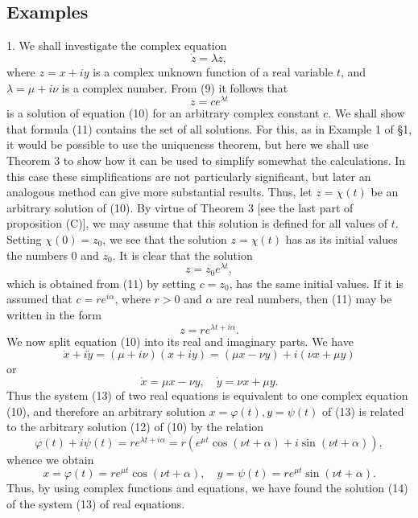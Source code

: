 \documentclass[10pt,a5paper]{book}
\theoremstyle{plain}
\theoremstyle{definition}
\theoremstyle{remark}
\begin{document}
\subsection*{Examples}
1. We shall investigate the complex equation
\begin{equation*}
\dot{z}=\lambda z, \tag{10}
\end{equation*}
where $z=x+i y$ is a complex unknown function of a real variable $t$, and $\lambda=\mu+i \nu$ is a complex number. From (9) it follows that
\begin{equation*}
z=c e^{\lambda t} \tag{11}
\end{equation*}
is a solution of equation (10) for an arbitrary complex constant $c$. We
shall show that formula (11) contains the set of all solutions. For this, as in Example 1 of §1, it would be possible to use the uniqueness theorem, but here we shall use Theorem 3 to show how it can be used to simplify somewhat the calculations. In this case these simplifications are not particularly significant, but later an analogous method can give more substantial results. Thus, let $z=\chi(t)$ be an arbitrary solution of (10). By virtue of Theorem 3 [see the last part of proposition (C)], we may assume that this solution is defined for all values of $t$. Setting $\chi(0)=z_{0}$, we see that the solution $z=\chi(t)$ has as its initial values the numbers 0 and $z_{0}$. It is clear that the solution
\[
z=z_{0} e^{\lambda t},
\]
which is obtained from (11) by setting $c=z_{0}$, has the same initial values. If it is assumed that $c=r e^{i \alpha}$, where $r>0$ and $\alpha$ are real numbers, then (11) may be written in the form
\begin{equation*}
z=r e^{\lambda t+i \alpha} . \tag{12}
\end{equation*}
We now split equation (10) into its real and imaginary parts. We have
\[
\dot{x}+i \dot{y}=(\mu+i \nu)(x+i y)=(\mu x-\nu y)+i(\nu x+\mu y)
\]
or
\begin{equation*}
\dot{x}=\mu x-\nu y, \quad \dot{y}=\nu x+\mu y . \tag{13}
\end{equation*}
Thus the system (13) of two real equations is equivalent to one complex equation (10), and therefore an arbitrary solution $x=\varphi(t), y=\psi(t)$ of (13) is related to the arbitrary solution (12) of (10) by the relation
\[
\varphi(t)+i \psi(t)=r e^{\lambda t+i \alpha}=r\left(e^{\mu t} \cos (\nu t+\alpha)+i \sin (\nu t+\alpha)\right),
\]
whence we obtain
\begin{equation*}
x=\varphi(t)=r e^{\mu t} \cos (\nu t+\alpha), \quad y=\psi(t)=r e^{\mu t} \sin (\nu t+\alpha) . \tag{14}
\end{equation*}
Thus, by using complex functions and equations, we have found the solution (14) of the system (13) of real equations.
\end{document}
